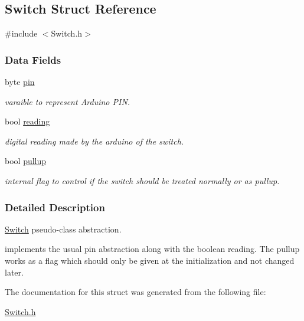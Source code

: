 \hypertarget{struct_switch}{\subsection{Switch Struct Reference}
\label{struct_switch}
}


{\ttfamily \#include $<$Switch.\+h$>$}

\subsubsection*{Data Fields}
\begin{DoxyCompactItemize}
\item 
\hypertarget{struct_switch_ab17e87ffa7bbb8cac12a4ec11a52b5e2}{byte \hyperlink{struct_switch_ab17e87ffa7bbb8cac12a4ec11a52b5e2}{pin}}\label{struct_switch_ab17e87ffa7bbb8cac12a4ec11a52b5e2}

\begin{DoxyCompactList}\small\item\em varaible to represent Arduino P\+I\+N. \end{DoxyCompactList}\item 
\hypertarget{struct_switch_a7f9125f9d9c793b9f3ca781b9b8364f2}{bool \hyperlink{struct_switch_a7f9125f9d9c793b9f3ca781b9b8364f2}{reading}}\label{struct_switch_a7f9125f9d9c793b9f3ca781b9b8364f2}

\begin{DoxyCompactList}\small\item\em digital reading made by the arduino of the switch. \end{DoxyCompactList}\item 
\hypertarget{struct_switch_a5e11bdb9d6e93a244d285a98d3149dc4}{bool \hyperlink{struct_switch_a5e11bdb9d6e93a244d285a98d3149dc4}{pullup}}\label{struct_switch_a5e11bdb9d6e93a244d285a98d3149dc4}

\begin{DoxyCompactList}\small\item\em internal flag to control if the switch should be treated normally or as pullup. \end{DoxyCompactList}\end{DoxyCompactItemize}


\subsubsection{Detailed Description}
\hyperlink{struct_switch}{Switch} pseudo-\/class abstraction.

implements the usual pin abstraction along with the boolean reading. The pullup works as a flag which should only be given at the initialization and not changed later. 

The documentation for this struct was generated from the following file\+:\begin{DoxyCompactItemize}
\item 
\hyperlink{_switch_8h}{Switch.\+h}\end{DoxyCompactItemize}
